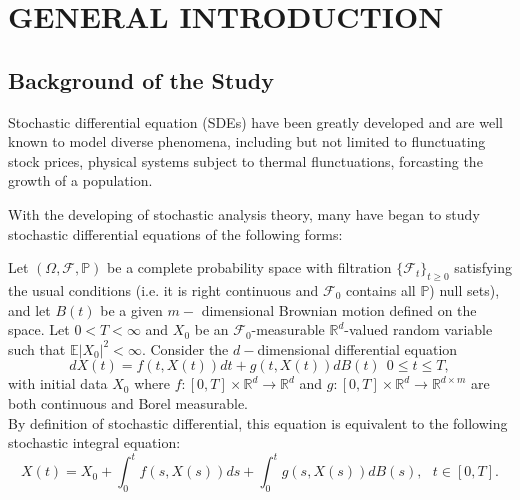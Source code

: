 \documentclass[a4 paper, 12pt]{report}
\theoremstyle{plain}
\begin{document}
\newpage
{}


\chapter{GENERAL INTRODUCTION}
\section{Background of the Study}
\noindent
\par Stochastic differential equation (SDEs) have been greatly developed and are well known to model diverse  phenomena, including but not limited to flunctuating stock prices, physical systems subject to thermal flunctuations, forcasting the growth of a population.
\par With the developing of stochastic analysis theory, many have began to study stochastic differential equations of the following forms:
\noindent
\par Let $(\Omega,\mathcal{F},\mathbb{P})$ be a complete probability space with filtration $\{\mathcal{F}_t\}_{t\geq 0}$ satisfying the usual conditions (i.e. it is right continuous and $\mathcal{F}_0$ contains all $\mathbb{P}$) null sets), and let $B(t)$ be a given $m-$ dimensional Brownian motion defined on the space. Let $0<T<\infty$ and $X_0$ be an $\mathcal{F}_0$-measurable $\mathbb{R}^d$-valued random variable such that $\mathbb{E}|X_0|^2<\infty$. Consider the $d-$dimensional differential equation
\begin{equation}\label{new1.11}
dX(t) = f(t,X(t))dt+g(t,X(t))dB(t)~~0\leq t\leq T,
\end{equation}
with initial data $X_0$ where $f:[0,T]\times \mathbb{R}^d\longrightarrow \mathbb{R}^d$ and $g:[0,T]\times \mathbb{R}^d\longrightarrow \mathbb{R}^{d\times m}$ are both continuous and Borel measurable.\\
 By definition of stochastic differential, this equation is equivalent to the following stochastic integral equation:
 \begin{equation}\label{new1.12}
     X(t) = X_0+\int_0^t f(s,X(s))ds+\int_0^tg(s,X(s))dB(s),~~~t\in[0,T].
 \end{equation}
\end{document}
